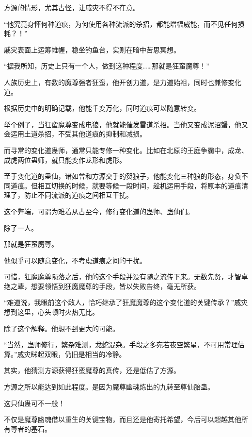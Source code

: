 
\begin{this_body}



方源的情形，尤其古怪，让戚灾不得不在意。

“他究竟身怀何种道痕，为何使用各种流派的杀招，都能增幅威能，而不见任何损耗？！”

戚灾表面上运筹帷幄，稳坐钓鱼台，实则在暗中苦思冥想。

“据我所知，历史上只有一个人，做到这种程度……那就是狂蛮魔尊！”

人族历史上，有数的魔尊强者狂蛮，他开创力道，是力道始祖，同时也兼修变化道。

根据历史中的明确记载，他能千变万化，同时道痕可以随意转变。

举个例子，当狂蛮魔尊变成电狼，他就能催发雷道杀招。当他又变成泥沼蟹，他又会运用土道杀招，不受其他道痕的抑制和减损。

而寻常的变化道蛊师，通常只能专修一种变化。比如在北原的王庭争霸中，成龙、成虎两位蛊师，就只能变作龙形和虎形。

至于变化道的蛊仙，诸如曾和方源交手的贺狼子，他能变化三种狼的形态，身负不同道痕。但相互切换的时候，就要等候一段时间，趁机运用手段，将原本的道痕清理了，防止不同流派的道痕之间相互干扰。

这个弊端，可谓为难着从古至今，修行变化道的蛊师、蛊仙们。

除了一人。

那就是狂蛮魔尊。

他似乎可以随意变化，不考虑道痕之间的干扰。

可惜，狂魔魔尊陨落之后，他的这个手段并没有随之流传下来。无数先贤，才智卓绝之辈，想要领悟到狂魔魔尊的手段，皆以失败告终，毫无所获。

“难道说，我眼前这个敌人，恰巧继承了狂魔魔尊的这个变化道的关键传承？”戚灾想到这里，心头顿时火热无比。

除了这个解释。他想不到更大的可能。

“当然，蛊师修行，繁杂难测，龙蛇混杂。手段之多宛若夜空繁星，不可用常理估算。”戚灾眯起双眼，仍旧是相当的冷静。

其实，他猜测方源获得狂蛮魔尊的真传，还是低估了方源。

方源之所以能达到如此程度。是因为魔尊幽魂炼出的九转至尊仙胎蛊。

这只仙蛊可不一般！

不仅是魔尊幽魂借以重生的关键宝物，而且还是他寄托希望，今后可以超越其他所有尊者的基石。


\end{this_body}
